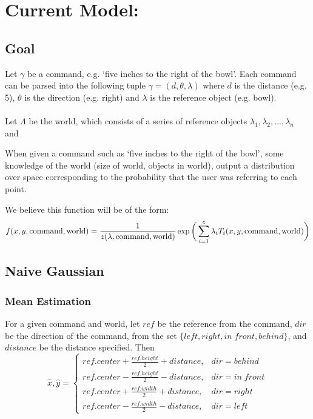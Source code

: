 \documentclass[12pt,letterpaper]{article}
\begin{document}
\section*{Current Model:}

\subsection{Goal}
Let $\gamma$ be a command, e.g. `five inches to the right of the bowl'. Each command can be parsed into the following tuple $\gamma = (d, \theta, \lambda)$ where $d$ is the distance (e.g. 5), $\theta$ is the direction (e.g. right) and $\lambda$ is the reference object (e.g. bowl). \\
\\
Let $\Lambda$ be the world, which consists of a series of reference objects $\lambda_1, \lambda_2, \ldots, \lambda_n$ and 

When given a command such as `five inches to the right of the bowl', some knowledge of the world (size of world, objects in world), output a distribution over space corresponding to the probability that the user was referring to each point.

We believe this function will be of the form:
\[
f(x, y, \textmd{command}, \textmd{world}) = \frac{1}{z(\lambda, \textmd{command}, \textmd{world})}\exp\bigg(\sum_{i = 1}^c \lambda_iT_i(x, y, \textmd{command}, \textmd{world})\bigg)
\]

\subsection{Naive Gaussian}
\subsubsection*{Mean Estimation}
For a given command and world, let $ref$ be the reference from the command, $dir$ be the direction of the command, from the set $\{left, right, in\;front, behind\}$, and $distance$ be the distance specified. Then
\[
\hat{x}, \hat{y} = \begin{cases} ref.center + \frac{ref.height}{2} + distance, & dir = behind \\
ref.center - \frac{ref.height}{2} - distance, & dir = in\;front \\
 ref.center + \frac{ref.width}{2} + distance, & dir = right \\
 ref.center - \frac{ref.width}{2} - distance, & dir = left \end{cases}
\]
\end{document}
